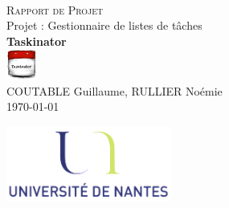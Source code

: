 \documentclass[a4paper,10pt]{article}
\begin{document}
\fancyhead[LE,CE,RE,LO,CO,RO]{}
\fancyfoot[LE,CE,RE,LO,CO,RO]{}
\renewcommand{\headrulewidth}{0.4pt}
\renewcommand{\footrulewidth}{0.4pt}

\begin{titlepage}

\vspace*{\fill}~
\begin{center}
{\large \textsc{Rapport de Projet}} \\
\vspace{1cm}
{\LARGE Projet : Gestionnaire de listes de tâches} \\
\vspace{1cm}
\textbf{Taskinator} \\
\includegraphics[height=1cm]{Images/Taskinator.png} \\
\vspace{1cm}
COUTABLE Guillaume, RULLIER Noémie \\
\today
\end{center}
\vspace*{\fill}

\begin{center}
\noindent 
\includegraphics[height=2.5cm]{Images/universite.png}
\end{center}
\pagebreak
\end{titlepage}

\newpage
\tableofcontents  

\newpage
\pagestyle{fancy}

\end{document}
